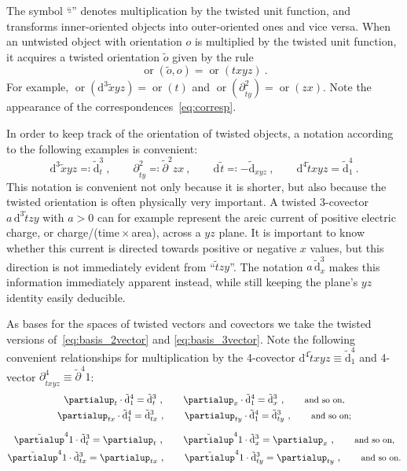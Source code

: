 \documentclass[\ifafour a4paper,12pt,\else a5paper,10pt,\fi%
onecolumn,oneside,article,%
british%
]{memoir}
\theoremstyle{remark}
\theoremstyle{innote}
\newcommand*{\de}{\partialup}%
\newcommand*{\di}{\mathrm{d}}%
\newcommand*{\defs}{\eqqcolon}
\renewcommand*{\|}[1][]{\nonscript\:#1\vert\nonscript\:\mathopen{}}
\newcommand*{\ddi}[2][]{\di^{#1}#2}
\newcommand*{\dde}[2][]{\de^{#1}_{#2}}
\newcommand*{\dti}[2][]{\tilde{\di}^{#1}_{#2}}
\newcommand*{\dte}[2][]{\tilde{\de}^{#1}#2}
\DeclareMathOperator{\Or}{or}
\begin{document}
The symbol \enquote{$\tilde{}$} denotes multiplication by the twisted unit function, and transforms inner-oriented objects into outer-oriented ones and vice versa. When an untwisted object with orientation $o$ is multiplied by the twisted unit function, it acquires a twisted orientation $\tilde{o}$ given by the rule
\begin{equation}
  \label{eq:twisted_orientation_rule}
  \Or(\tilde{o},o) = \Or(txyz) \ .
\end{equation}
For example, $\Or(\ddi[3]{\tilde{x}yz}) = \Or(t)$ and $\Or(\dde[2]{\tilde{t}y})=\Or(zx)$. Note the appearance of the correspondences~\eqref{eq:corresp}.

In order to keep track of the orientation of twisted objects, a notation according to the following examples is convenient:
\begin{equation}
  \label{eq:notation_twisted_exchange}
  \ddi[3]{\tilde{x}yz} \defs \dti[3]{t} \ ,
  \qquad
  \dde[2]{\tilde{t}y} \defs \dte[2]{zx} \ ,  
  \qquad
  \ddi{\tilde{t}} \defs -\dti{xyz} \ ,
  \qquad
  \ddi[4]{\tilde{t}xyz}=\dti[4]{1} \ .
\end{equation}
This notation is convenient not only because it is shorter, but also because the twisted orientation is often physically very important. A twisted 3-covector $a\,\ddi[3]{\tilde{t}zy}$ with $a>0$ can for example represent the areic current of positive electric charge, or charge/(time${}\times{}$area), across a $yz$ plane. It is important to know whether this current is directed towards positive or negative $x$ values, but this direction is not immediately evident from \enquote{$\tilde{t}zy$}. The notation $a\,\dti[3]{x}$ makes this information immediately apparent instead, while still keeping the plane's $yz$ identity easily deducible.



As bases for the spaces of twisted vectors and covectors we take the twisted versions of~\eqref{eq:basis_2vector} and \eqref{eq:basis_3vector}. Note the following convenient relationships for multiplication by the 4-covector $\ddi[4]{\tilde{t}xyz} \equiv \dti[4]{1}$ and 4-vector $\dde[4]{\tilde{t}xyz} \equiv \dte[4]{1}$:
\begin{equation}
  \label{eq:multipl_volume}
  \begin{gathered}
    \dde{t}\cdot\dti[4]{1} = \dti[3]{t} \ ,
    \qquad
    \dde{x}\cdot\dti[4]{1} = \dti[3]{x} \ ,
    \qquad
    \text{\small and so on,}
    \\
    \dde{tx}\cdot\dti[4]{1} = \dti[3]{tx} \ ,
    \qquad
    \dde{ty}\cdot\dti[4]{1} = \dti[3]{ty} \ ,
    \qquad
    \text{\small and so on;}
    \\[2\jot]
    \dte[4]{1}\cdot\dti[3]{t} = \dde{t} \ ,
    \qquad
    \dte[4]{1} \cdot \dti[3]{x} = \dde{x} \ ,
    \qquad
    \text{\small and so on,}
    \\
    \dte[4]{1} \cdot \dti[3]{tx} = \dde{tx}\ ,
    \qquad
   \dte[4]{1} \cdot \dti[3]{ty} =  \dde{ty} \ ,
    \qquad
    \text{\small and so on.}
  \end{gathered}
\end{equation}
\end{document}
